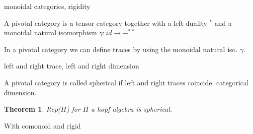\documentclass{article}
\newtheorem{theorem}{Theorem}[section]
\newenvironment{proof}[1][Proof]{\begin{trivlist}
\item[\hskip \labelsep {\bfseries #1}]}{\end{trivlist}}
\newenvironment{definition}[1][Definition]{\begin{trivlist}
\item[\hskip \labelsep {\bfseries #1}]}{\end{trivlist}}
\begin{document}
\begin{definition}
monoidal categories, rigidity
\end{definition}
\begin{definition}
A pivotal category is a tensor category together with a left duality $^*$ and a monoidal natural isomorphism $\gamma:id \rightarrow -^{**}$
\end{definition}
In a pivotal category we can define traces by using the monoidal natural iso. $\gamma$.
\begin{definition}
left and right trace, left and right dimension
\end{definition}
\begin{definition}
A pivotal category is called spherical if left and right traces coincide. categorical dimension.
\end{definition}
\begin{theorem}
Rep($H$) for $H$ a hopf algebra is spherical.
\end{theorem}
\begin{proof}
With comonoid and rigid
\end{proof}
\end{document}
